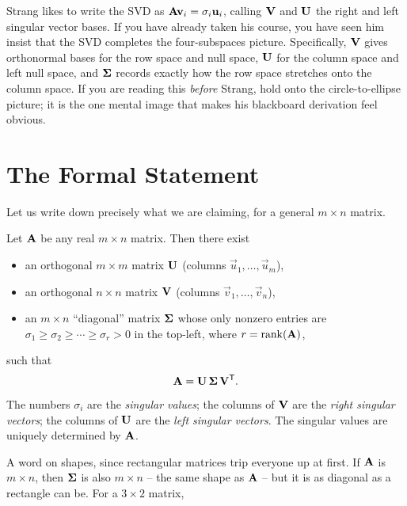 \begin{strangbox}
Strang likes to write the SVD as $\mathbf{A}\mathbf{v}_i = \sigma_i \mathbf{u}_i$, calling
$\mathbf{V}$ and $\mathbf{U}$ the right and left singular vector bases. If you have
already taken his course, you have seen him insist that the SVD completes the
four-subspaces picture. Specifically, $\mathbf{V}$ gives orthonormal bases for the
row space and null space, $\mathbf{U}$ for the column space and left null space, and
$\mathbf{\Sigma}$ records exactly how the row space stretches onto the column space. If you are
reading this \emph{before} Strang, hold onto the circle-to-ellipse picture; it is
the one mental image that makes his blackboard derivation feel obvious.
\end{strangbox}

\section{The Formal Statement}
\label{ch29:formal-statement}

Let us write down precisely what we are claiming, for a general $m \times n$
matrix.

\begin{formalbox}
\begin{theorem}
\label{ch29:thm-svd}
Let $\mathbf{A}$ be any real $m \times n$ matrix. Then there exist
\begin{itemize}
  \item an orthogonal $m \times m$ matrix $\mathbf{U}$ (columns $\vec{u}_1,\dots,\vec{u}_m$),
  \item an orthogonal $n \times n$ matrix $\mathbf{V}$ (columns $\vec{v}_1,\dots,\vec{v}_n$),
  \item an $m \times n$ ``diagonal'' matrix $\mathbf{\Sigma}$ whose only nonzero
        entries are $\sigma_1 \ge \sigma_2 \ge \cdots \ge \sigma_r > 0$ in the
        top-left, where $r = \operatorname{rank}(\mathbf{A})$,
\end{itemize}
such that
\[
  \mathbf{A} = \mathbf{U}\,\mathbf{\Sigma}\,\mathbf{V}^{\mathsf{T}}.
\]
The numbers $\sigma_i$ are the \emph{singular values}; the columns of $\mathbf{V}$
are the \emph{right singular vectors}; the columns of $\mathbf{U}$ are the
\emph{left singular vectors}. The singular values are uniquely determined by
$\mathbf{A}$.
\end{theorem}
\end{formalbox}

A word on shapes, since rectangular matrices trip everyone up at first. If
$\mathbf{A}$ is $m \times n$, then $\mathbf{\Sigma}$ is also $m \times n$ -- the same
shape as $\mathbf{A}$ -- but it is as diagonal as a rectangle can be. For a
$3 \times 2$ matrix,

